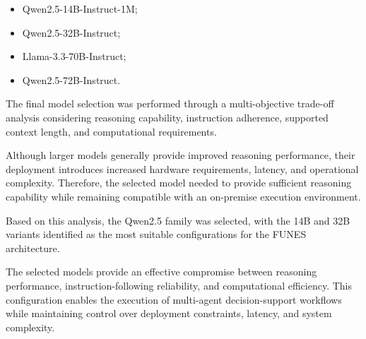 \begin{itemize}
    \item Qwen2.5-14B-Instruct-1M;
    \item Qwen2.5-32B-Instruct;
    \item Llama-3.3-70B-Instruct;
    \item Qwen2.5-72B-Instruct.
\end{itemize}

The final model selection was performed through a multi-objective trade-off analysis considering reasoning capability, instruction adherence, supported context length, and computational requirements.

Although larger models generally provide improved reasoning performance, their deployment introduces increased hardware requirements, latency, and operational complexity. Therefore, the selected model needed to provide sufficient reasoning capability while remaining compatible with an on-premise execution environment.

Based on this analysis, the Qwen2.5 family was selected, with the 14B and 32B variants identified as the most suitable configurations for the FUNES architecture.

The selected models provide an effective compromise between reasoning performance, instruction-following reliability, and computational efficiency. This configuration enables the execution of multi-agent decision-support workflows while maintaining control over deployment constraints, latency, and system complexity.